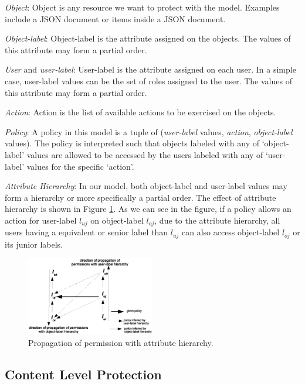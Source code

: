 \emph{Object}: Object is any resource we want to protect with the model. Examples include a JSON document or items inside a JSON document. 

\emph{Object-label}: Object-label is the attribute assigned on the objects. The values of this attribute  may form a partial order.

\emph{User} and \emph{user-label}: User-label is the attribute assigned on each user. In a simple case, user-label values can be the set of roles assigned to the user. The values of this attribute may form a partial order.

\emph{Action}: Action is the list of available actions to be exercised on the objects. 

\emph{Policy}: A policy in this model is a tuple of (\emph{user-label} values, \emph{action},  \emph{object-label} values). The policy is interpreted such that objects labeled with any of `object-label' values are allowed to be accessed by the users labeled with any of  `user-label' values for the specific `action'.

\emph{Attribute Hierarchy}: In our model, both object-label and user-label values  may form a hierarchy or more specifically a partial order. The effect of attribute hierarchy is shown in Figure \ref{fig:attribute-hierarchy}. As we can see in the figure, if a policy allows an action for user-label $l_{uj}$ on object-label $l_{oj}$, due to the attribute hierarchy, all users having a equivalent or senior label than $l_{uj}$ can also access object-label $l_{oj}$ or its junior labels.

\begin{figure}
  \centering
    \includegraphics[width=0.5\textwidth]{CODASPY15/attribute-hierarchy}
 \caption{Propagation of permission with attribute hierarchy.}
 \label{fig:attribute-hierarchy}
\end{figure}

 \subsection{Content Level Protection}


